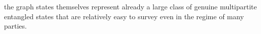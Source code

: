 \documentclass[
aps,
pra,
floatfix,
]{revtex4-2}
\theoremstyle{plain}
\theoremstyle{definition}
\begin{document}
the graph states themselves represent already a large class of genuine multipartite entangled states that are relatively easy to survey even in the regime of many parties.
\end{document}
